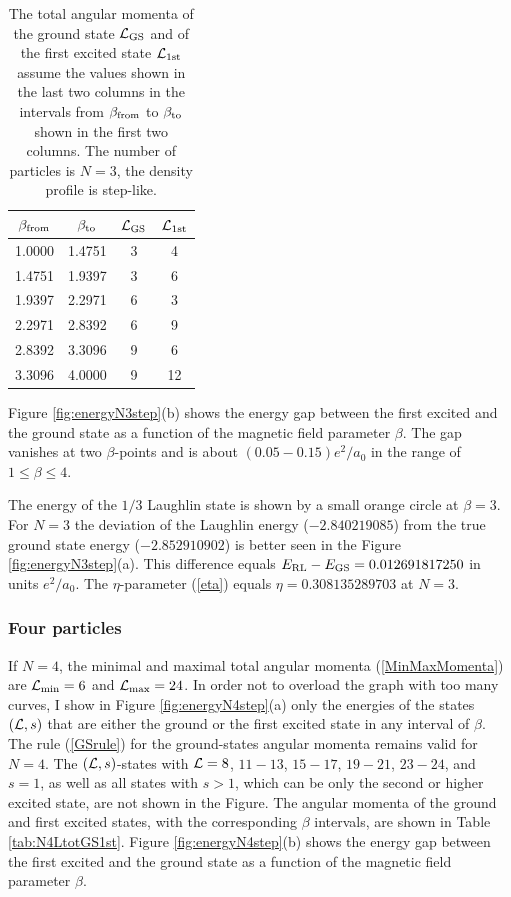 \documentclass[aps,prb,10pt%
]{revtex4-2}
\begin{document}
\begin{table}[!ht]
\caption{The total angular momenta of the ground state ${\cal L}_{\rm GS}$ and of the first excited state ${\cal L}_{\rm 1st}$ assume the values shown in the last two columns in the intervals from $\beta_{\rm from}$ to $\beta_{\rm to}$ shown in the first two columns. The number of particles is  $N=3$, the density profile is step-like. \label{tab:N3LtotGS1st}}
\begin{tabular}{cccc}
$\beta_{\rm from}$ & $\beta_{\rm to}$   & ${\cal L}_{\rm GS}$   & ${\cal L}_{\rm 1st}$\\
\hline
1.0000	& 1.4751	& 3	& 4 \\
1.4751	& 1.9397	& 3	& 6 \\
1.9397	& 2.2971	& 6	& 3 \\
2.2971	& 2.8392	& 6	& 9 \\
2.8392	& 3.3096	& 9	& 6 \\
3.3096	& 4.0000	& 9	& 12 \\
\end{tabular}
\end{table}

Figure \ref{fig:energyN3step}(b) shows the energy gap between the first excited and the ground state as a function of the magnetic field parameter $\beta$. The gap vanishes at two $\beta$-points and is about $(0.05-0.15)e^2/a_0$ in the range of $1\le \beta\le 4$. 

The energy of the $1/3$ Laughlin state is shown by a small orange circle at $\beta=3$. For $N=3$ the deviation of the Laughlin energy ($-2.840219085$) from the true ground state energy ($-2.852910902$) is better seen in the Figure \ref{fig:energyN3step}(a). This difference equals $E_{\rm RL}-E_{\rm GS}=0.012691817250$ in units $e^2/a_0$. The $\eta$-parameter (\ref{eta}) equals $\eta=0.308135289703$ at $N=3$.

\subsubsection{Four particles}

If $N=4$, the minimal and maximal total angular momenta (\ref{MinMaxMomenta}) are ${\cal L}_{\min}=6$ and ${\cal L}_{\max}=24$. In order not to overload the graph with too many curves, I show in Figure \ref{fig:energyN4step}(a) only the energies of the states $({\cal L},s)$ that are either the ground or the first excited state in any interval of $\beta$. The rule (\ref{GSrule}) for the ground-states angular momenta remains valid for $N=4$. The $({\cal L},s)$-states with ${\cal L}=8$, $11- 13$, $15-17$, $19-21$, $23-24$, and $s=1$, as well as all states with $s>1$, which can be only the second or higher excited state, are not shown in the Figure. The angular momenta of the ground and first excited states, with the corresponding $\beta$ intervals, are shown in Table \ref{tab:N4LtotGS1st}. Figure \ref{fig:energyN4step}(b) shows the energy gap between the first excited and the ground state as a function of the magnetic field parameter $\beta$. 
\end{document}
